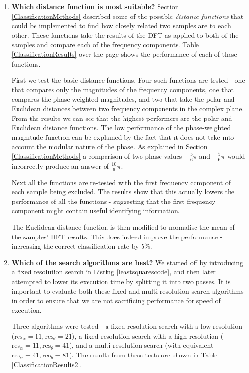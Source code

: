 \begin{enumerate}
	\item \textbf{Which distance function is most suitable?}
		Section \ref{ClassificationMethods} described some of the possible \emph{distance functions} that could be implemented to find how closely related two samples are to each other.
		These functions take the results of the DFT as applied to both of the samples and compare each of the frequency components.
		Table \ref{ClassificationResults} over the page shows the performance of each of these functions.
		
		First we test the basic distance functions.
		Four such functions are tested - one that compares only the magnitudes of the frequency components, one that compares the phase weighted magnitudes, and two that take the polar and Euclidean distances between two frequency components in the complex plane.
		From the results we can see that the highest performers are the polar and Euclidean distance functions.
		The low performance of the phase-weighted magnitude function can be explained by the fact that it does not take into account the modular nature of the phase.
		As explained in Section \ref{ClassificationMethods} a comparison of two phase values $+\frac{5}{6}\pi$ and $-\frac{5}{6}\pi$ would incorrectly produce an answer of $\frac{10}{6}\pi$.
		
		Next all the functions are re-tested with the first frequency component of each sample being excluded.
		The results show that this actually lowers the performance of all the functions - suggesting that the first frequency component might contain useful identifying information.
		
		The Euclidean distance function is then modified to normalise the mean of the samples' DFT results.
		This does indeed improve the performance - increasing the correct classification rate by 5\%.
	
	\item \textbf{Which of the search algorithms are best?}
		We started off by introducing a fixed resolution search in Listing \ref{leastsquarescode}, and then later attempted to lower its execution time by splitting it into two passes.
		It is important to evaluate both these fixed and multi-resolution search algorithms in order to ensure that we are not sacrificing performance for speed of execution.
		
		Three algorithms were tested - a fixed resolution search with a low resolution ($\text{res}_\alpha = 11, \text{res}_\theta = 21$),
		a fixed resolution search with a high resolution ($\text{res}_\alpha = 11, \text{res}_\theta = 41$),
		and a multi-resolution search (with equivalent $\text{res}_\alpha = 41, \text{res}_\theta = 81$).
		The results from these tests are shown in Table \ref{ClassificationResults2}.
		

\end{enumerate}
